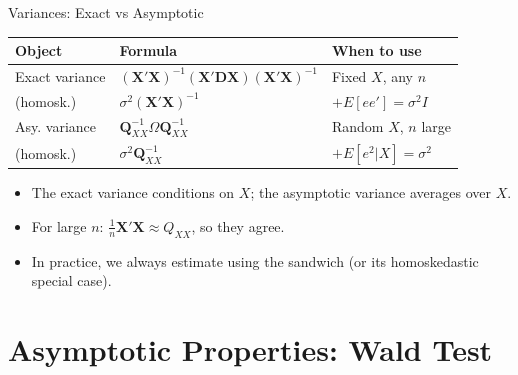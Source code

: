 \documentclass[aspectratio=169, handout, t]{beamer}
\numberwithin{equation}{section}
\begin{document}
\begin{frame}{Variances: Exact vs Asymptotic}

\renewcommand{\arraystretch}{1.4}
\begin{tabular}{lll}
\toprule
\textbf{Object} & \textbf{Formula} & \textbf{When to use} \\
\midrule
Exact variance & $(\bm{X}'\bm{X})^{-1}(\bm{X}'\bm{D}\bm{X})(\bm{X}'\bm{X})^{-1}$ & Fixed $X$, any $n$ \\
\quad (homosk.) & $\sigma^2(\bm{X}'\bm{X})^{-1}$ & $+ E[ee']=\sigma^2 I$ \\
\midrule
Asy. variance & $\bm{Q}_{XX}^{-1}\Omega\bm{Q}_{XX}^{-1}$ & Random $X$, $n$ large \\
\quad (homosk.) & $\sigma^2 \bm{Q}_{XX}^{-1}$ & $+ E[e^2|X]=\sigma^2$ \\
\bottomrule
\end{tabular}
\renewcommand{\arraystretch}{1.0}

\pause

\bigskip

\begin{itemize}
    \item The exact variance conditions on $X$; the asymptotic variance averages over $X$.
    \item For large $n$: $\frac{1}{n}\bm{X'X} \approx Q_{XX}$, so they agree.
    \item In practice, we always estimate using the sandwich (or its homoskedastic special case).
\end{itemize}

\end{frame}

\section{Asymptotic Properties: Wald Test}
\setcounter{subsection}{1}
\end{document}
